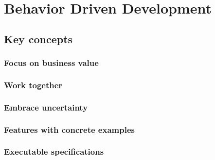 \section{Behavior Driven Development}\label{sec:bdd}


\subsection{Key concepts}\label{subsec:key-concepts}


\subsubsection{Focus on business value}

\subsubsection{Work together}

\subsubsection{Embrace uncertainty}

\subsubsection{Features with concrete examples}

\subsubsection{Executable specifications}


